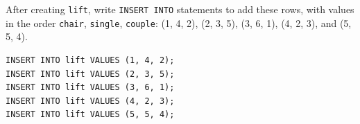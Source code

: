 \begin{blocksection}
\question After creating \lstinline{lift}, write \lstinline{INSERT INTO} statements to add these rows, with values in the order \lstinline{chair}, \lstinline{single}, \lstinline{couple}: (1, 4, 2), (2, 3, 5), (3, 6, 1), (4, 2, 3), and (5, 5, 4).

\begin{solution}[2in]
\begin{lstlisting}
INSERT INTO lift VALUES (1, 4, 2);
INSERT INTO lift VALUES (2, 3, 5);
INSERT INTO lift VALUES (3, 6, 1);
INSERT INTO lift VALUES (4, 2, 3);
INSERT INTO lift VALUES (5, 5, 4);
\end{lstlisting}
\end{solution}
\end{blocksection}
